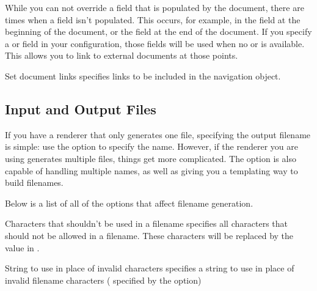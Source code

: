 While you can not override a field that is populated by the document,
there are times when a field isn't populated.  This occurs, for example,
in the  field at the beginning of the document, or the
 field at the end of the document.  If you specify a 
or  field in your configuration, those fields will be used
when no  or  is available.  This allows you to link
to external documents at those points.

\begin{configuration}{Set document links}
specifies links to be included in the navigation object.
\end{configuration}


\subsection{Input and Output Files\label{sec:config-files}}

If you have a renderer that only generates one file, specifying the output
filename is simple: use the  option to specify
the name.  However, if the renderer you are using generates multiple
files, things get more complicated.  The  option
is also capable of handling multiple names, as well as giving you a
templating way to build filenames.

Below is a list of all of the options that affect filename generation.

\begin{configuration}{Characters that shouldn't be used in a filename}
specifies all characters that should not be allowed in a filename.
These characters will be replaced by the value in
.
\end{configuration}

\begin{configuration}{String to use in place of invalid characters}
specifies a string to use in place of invalid filename characters (
specified by the  option)
\end{configuration}

